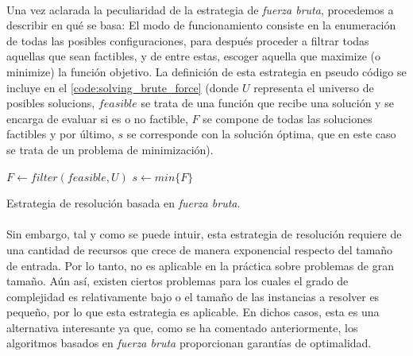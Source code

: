 \documentclass{subfiles}
\begin{document}
        \paragraph{}
        Una vez aclarada la peculiaridad de la estrategia de \emph{fuerza bruta}, procedemos a describir en qué se basa: El modo de funcionamiento consiste en la enumeración de todas las posibles configuraciones, para después proceder a filtrar todas aquellas que sean factibles, y de entre estas, escoger aquella que maximize (o minimize) la función objetivo. La definición de esta estrategia en pseudo código se incluye en el \cref{code:solving_brute_force} (donde $U$ representa el universo de posibles solucions, $feasible$ se trata de una función que recibe una solución y se encarga de evaluar si es o no factible, $F$ se compone de todas las soluciones factibles y por último, $s$ se corresponde con la solución óptima, que en este caso se trata de un problema de minimización).

        \begin{algorithm}[ht]
          \SetAlgoLined
          $F \gets filter(feasible, U)$\;
          $s \gets min\{F\}$\;
          \caption{Estrategia de resolución basada en \emph{fuerza bruta}.}
          \label{code:solving_brute_force}
        \end{algorithm}

        \paragraph{}
        Sin embargo, tal y como se puede intuir, esta estrategia de resolución requiere de una cantidad de recursos que crece de manera exponencial respecto del tamaño de entrada. Por lo tanto, no es aplicable en la práctica sobre problemas de gran tamaño. Aún así, existen ciertos problemas para los cuales el grado de complejidad es relativamente bajo o el tamaño de las instancias a resolver es pequeño, por lo que esta estrategia es aplicable. En dichos casos, esta es una alternativa interesante ya que, como se ha comentado anteriormente, los algoritmos basados en \emph{fuerza bruta} proporcionan garantías de optimalidad.  
\end{document}
